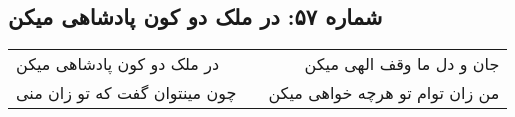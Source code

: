 \begin{center}
\section*{شماره ۵۷: در ملک دو کون پادشاهی میکن}
\label{sec:057}
\begin{longtable}{l p{0.5cm} r}
در ملک دو کون پادشاهی میکن
&&
جان و دل ما وقف الهی میکن
\\
چون مینتوان گفت که تو زان منی
&&
من زان توام تو هرچه خواهی میکن
\\
\end{longtable}
\end{center}
